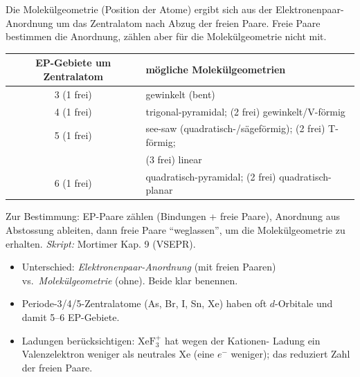 
Die Molekülgeometrie (Position der Atome) ergibt sich aus der
Elektronenpaar-Anordnung um das Zentralatom nach Abzug der freien Paare.
Freie Paare bestimmen die Anordnung, zählen aber für die Molekülgeometrie
nicht mit.

\begin{werkzeugkasten}
\begin{center}
\begin{tabular}{@{}c l@{}}
  EP-Gebiete um Zentralatom & mögliche Molekülgeometrien \\
  \hline
  3  (1 frei) & gewinkelt (bent) \\
  4  (1 frei) & trigonal-pyramidal; (2 frei) gewinkelt/V-förmig \\
  5  (1 frei) & see-saw (quadratisch-/sägeförmig); (2 frei) T-förmig; \\
     & (3 frei) linear \\
  6  (1 frei) & quadratisch-pyramidal; (2 frei) quadratisch-planar \\
\end{tabular}
\end{center}
Zur Bestimmung: EP-Paare zählen (Bindungen + freie Paare), Anordnung aus
Abstossung ableiten, dann freie Paare ``weglassen'', um die Molekülgeometrie zu
erhalten.
\textit{Skript:} Mortimer Kap. 9 (VSEPR).
\end{werkzeugkasten}

\begin{achtung}
\begin{itemize}
  \item Unterschied: \textit{Elektronenpaar-Anordnung} (mit freien Paaren) vs.\
        \textit{Molekülgeometrie} (ohne). Beide klar benennen.
  \item Periode-3/4/5-Zentralatome (As, Br, I, Sn, Xe) haben oft $d$-Orbitale
        und damit 5--6 EP-Gebiete.
  \item Ladungen berücksichtigen: $\mathrm{XeF_3^+}$ hat wegen der Kationen-
        Ladung ein Valenzelektron weniger als neutrales Xe (eine $e^-$ weniger);
        das reduziert Zahl der freien Paare.
\end{itemize}
\end{achtung}
